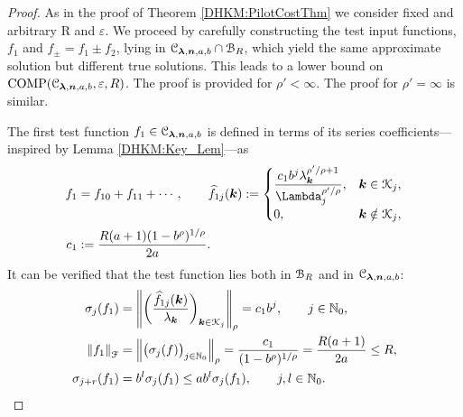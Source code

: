 \documentclass[USenglish]{article}
\theoremstyle{dgthm}
\theoremstyle{dgthm}
\theoremstyle{dgthm}
\theoremstyle{dgthm}
\theoremstyle{dgdef}
\theoremstyle{definition}
\DeclareMathOperator{\COMP}{COMP}
\newcommand{\hf}{\widehat{f}}
\newcommand{\norm}[2][{}]{\ensuremath{\left \lVert #2 \right \rVert}_{#1}}
\begin{document}
\begin{proof}

As in the proof of Theorem \ref{DHKM:PilotCostThm} we consider fixed and arbitrary R and $\varepsilon$.
We proceed by carefully constructing the test input functions, $f_1$ and $f_{\pm} = f_1 \pm f_2$, lying in ${\mathcal{C}}_{\boldsymbol{\lambda},{\boldsymbol{n}},a,b}\cap {\mathcal{B}}_{R}$, which yield the same approximate solution but different true solutions.  This leads to a lower bound on $\COMP(\calC_{\boldsymbol{\lambda},\bsn,a,b},\varepsilon,R)$. The proof is provided for $\rho' < \infty$.  The proof for $\rho' = \infty$ is similar.

The first test function $f_1 \in {\mathcal{C}}_{\boldsymbol{\lambda},{\boldsymbol{n}},a,b}$ is defined in terms of its series coefficients---inspired by Lemma \ref{DHKM:Key_Lem}---as
\begin{align}
\nonumber
f_1 &= f_{10} + f_{11} +  \cdots, \qquad
\hf_{1j}(\bsk) := \begin{cases}
\displaystyle
\frac{c_1 b^{j} \lambda_{\bsk}^{\rho'/\rho+1}}{\Lambda_j^{\rho'/\rho}},  & \bsk \in \calK_j,
\\
0, & \bsk \notin \calK_j,
\end{cases}
\\
\nonumber
c_1 &:=  \frac{R(a+1)(1 - b^\rho)^{1/\rho}}{2a}.
\end{align}
It can be verified that the test function lies both in ${\mathcal{B}}_{R}$ and in ${\mathcal{C}}_{\boldsymbol{\lambda},{\boldsymbol{n}},a,b}$:
\begin{align}
\nonumber
\sigma_j(f_1) & = \norm[\rho]{\biggl(\frac{\hf_{1j}(\bsk)}{\lambda_{\bsk}} \biggr)_{\bsk \in \calK_j}} 
= c_1 b^j, \qquad j \in \N_0,\\
\nonumber
\norm[\calF]{f_1} &= \norm[\rho]{\bigl( \sigma_j(f) \bigr)_{j \in \N_0} } 
=  \frac{c_1}{(1 - b^\rho)^{1/\rho}} = \frac{R(a+1)}{2a} \le R,
\\
\nonumber
\sigma_{j+r}(f_1) &= 
b^{l} \sigma_j(f_1) \le a b^l \sigma_j(f_1), \qquad j,l \in \N_0.
\end{align}


\end{proof}
\end{document}
